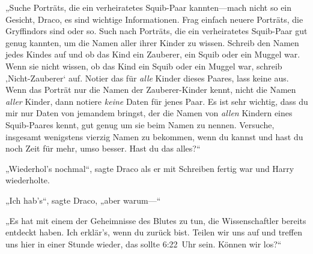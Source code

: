„Suche Porträts, die ein verheiratetes Squib-Paar kannten—mach nicht so ein Gesicht, Draco, es sind wichtige Informationen. Frag einfach neuere Porträts, die Gryffindors sind oder so. Such nach Porträts, die ein verheiratetes Squib-Paar gut genug kannten, um die Namen aller ihrer Kinder zu wissen. Schreib den Namen jedes Kindes auf und ob das Kind ein Zauberer, ein Squib oder ein Muggel war. Wenn sie nicht wissen, ob das Kind ein Squib oder ein Muggel war, schreib ‚Nicht-Zauberer‘ auf. Notier das für \emph{alle} Kinder dieses Paares, lass keine aus. Wenn das Porträt nur die Namen der Zauberer-Kinder kennt, nicht die Namen \emph{aller} Kinder, dann notiere \emph{keine} Daten für jenes Paar. Es ist sehr wichtig, dass du mir nur Daten von jemandem bringst, der die Namen von \emph{allen} Kindern eines Squib-Paares kennt, gut genug um sie beim Namen zu nennen. Versuche, insgesamt wenigstens vierzig Namen zu bekommen, wenn du kannst und hast du noch Zeit für mehr, umso besser. Hast du das alles?“

„Wiederhol’s nochmal“, sagte Draco als er mit Schreiben fertig war und Harry wiederholte.

„Ich hab’s“, sagte Draco, „aber warum—“

„Es hat mit einem der Geheimnisse des Blutes zu tun, die Wissenschaftler bereits entdeckt haben. Ich erklär’s, wenn du zurück bist. Teilen wir uns auf und treffen uns hier in einer Stunde wieder, das sollte 6:22~Uhr sein. Können wir los?“


